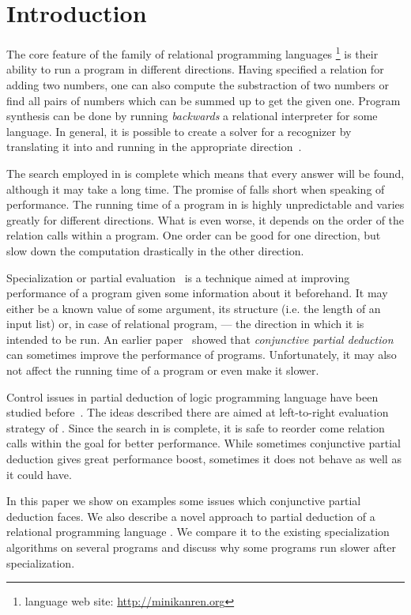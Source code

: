 \section{Introduction}

The core feature of the family of relational programming languages \mk{}\footnote{\mk{} language web site: \url{http://minikanren.org}} is their ability to run a program in different directions.
Having specified a relation for adding two numbers, one can also compute the substraction of two numbers or find all pairs of numbers which can be summed up to get the given one.
Program synthesis can be done by running \emph{backwards} a relational interpreter for some language.
In general, it is possible to create a solver for a recognizer by translating it into \mk{} and running in the appropriate direction~\cite{lozov2019relational}.

The search employed in \mk{} is complete which means that every answer will be found, although it may take a long time.
The promise of \mk{} falls short when speaking of performance.
The running time of a program in \mk{} is highly unpredictable and varies greatly for different directions.
What is even worse, it depends on the order of the relation calls within a program.
One order can be good for one direction, but slow down the computation drastically in the other direction.

Specialization or partial evaluation~\cite{jonesbook} is a technique aimed at improving performance of a program given some information about it beforehand.
It may either be a known value of some argument, its structure (i.e. the length of an input list) or, in case of relational program, --- the direction in which it is intended to be run.
An earlier paper~\cite{lozov2019relational} showed that \emph{conjunctive partial deduction}~\cite{de1999conjunctive} can sometimes improve the performance of \mk{} programs.
Unfortunately, it may also not affect the running time of a program or even make it slower.

Control issues in partial deduction of logic programming language \pro{} have been studied before~\cite{leuschel2002logic}.
The ideas described there are aimed at left-to-right evaluation strategy of \pro{}.
Since the search in \mk{} is complete, it is safe to reorder come relation calls within the goal for better performance.
While sometimes conjunctive partial deduction gives great performance boost, sometimes it does not behave as well as it could have.

In this paper we show on examples some issues which conjunctive partial deduction faces.
We also describe a novel approach to partial deduction of a relational programming language \mk{}.
We compare it to the existing specialization algorithms on several programs and discuss why some \mk{} programs run slower after specialization.
